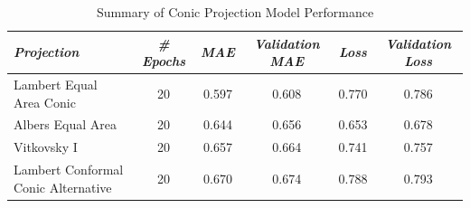 \begin{table}[H]
    \centering
    \caption{Summary of Conic Projection Model Performance}
    \label{conic_results_table}
    \renewcommand{\arraystretch}{1.2} %
    \begin{tabular}{|l|c|c|c|c|c|}
        \hline
        \rowcolor[gray]{0.9}
        \textbf{\emph{Projection}}          & \textbf{\emph{\# Epochs}} & \textbf{\emph{MAE}} & \textbf{\emph{Validation MAE}} & \textbf{\emph{Loss}} & \textbf{\emph{Validation Loss}} \\ \hline
        Lambert Equal Area Conic            & 20                        & 0.597               & 0.608                          & 0.770                & 0.786                           \\ \hline
        Albers Equal Area                   & 20                        & 0.644               & 0.656                          & 0.653                & 0.678                           \\ \hline
        Vitkovsky I                         & 20                        & 0.657               & 0.664                          & 0.741                & 0.757                           \\ \hline
        Lambert Conformal Conic Alternative & 20                        & 0.670               & 0.674                          & 0.788                & 0.793                           \\ \hline
    \end{tabular}
\end{table}
